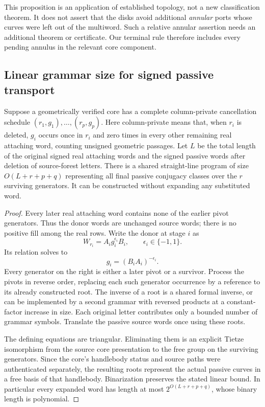 This proposition is an application of established topology, not a new
classification theorem.  It does not assert that the disks avoid additional
\emph{annular} ports whose curves were left out of the multiword.  Such a
relative annular assertion needs an additional theorem or certificate.
Our terminal rule therefore includes every pending annulus in the relevant
core component.

\subsection{Linear grammar size for signed passive transport}

\begin{proposition}
\label{prop:transport}
Suppose a geometrically verified core has a complete column-private
cancellation schedule $(r_1,g_1),\ldots,(r_p,g_p)$.  Here column-private
means that, when $r_i$ is deleted, $g_i$ occurs once in $r_i$ and zero times
in every other remaining real attaching word, counting unsigned geometric
passages.  Let $L$ be the total length of the original signed real attaching
words and the signed passive words after deletion of source-forest letters.
There is a shared straight-line program of size $O(L+r+p+q)$ representing
all final passive conjugacy classes over the $r$ surviving generators.
It can be constructed without expanding any substituted word.
\end{proposition}

\begin{proof}
Every later real attaching word contains none of the earlier pivot
generators.  Thus the donor words are unchanged source words; there is no
positive fill among the real rows.  Write the donor at stage $i$ as
\[
 W_{r_i}=A_i g_i^{\epsilon_i}B_i,\qquad \epsilon_i\in\{-1,1\}.
\]
Its relation solves to
\[
 g_i=(B_iA_i)^{-\epsilon_i}.
\]
Every generator on the right is either a later pivot or a survivor.  Process
the pivots in reverse order, replacing each such generator occurrence by a
reference to its already constructed root.  The inverse of a root is a
shared formal inverse, or can be implemented by a second grammar with
reversed products at a constant-factor increase in size.  Each original
letter contributes only a bounded number of grammar symbols.  Translate
the passive source words once using these roots.

The defining equations are triangular.  Eliminating them is an explicit
Tietze isomorphism from the source core presentation to the free group on
the surviving generators.  Since the core's handlebody status and source
paths were authenticated separately, the resulting roots represent the
actual passive curves in a free basis of that handlebody.  Binarization
preserves the stated linear bound.  In particular every expanded word has
length at most $2^{O(L+r+p+q)}$, whose binary length is polynomial.
\end{proof}

